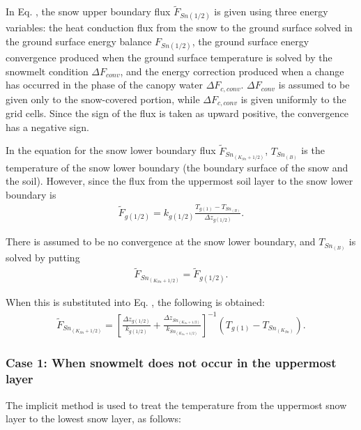 In Eq. \hyperref[8-30]{}, the snow upper boundary flux \(\widetilde{F}_{Sn(1/2)}\) is given using three energy variables: the heat conduction flux from the snow to the ground surface solved in the
ground surface energy balance \(F_{Sn(1/2)}\), the ground surface energy convergence produced when the ground surface temperature is solved by the snowmelt condition \(\Delta F_{conv}\), and the
energy correction produced when a change has occurred in the phase of the canopy water \(\Delta F_{c,conv}\). \(\Delta F_{conv}\) is assumed to be given only to the snow-covered portion, while
\(\Delta F_{c,conv}\) is given uniformly to the grid cells. Since the sign of the flux is taken as upward positive, the convergence has a negative sign.

In the equation for the snow lower boundary flux \(\widetilde{F}_{Sn_{(K_{Sn}+1/2)}}\), \(T_{Sn_{(B)}}\) is the temperature of the snow lower boundary (the boundary surface of the snow and the soil).
However, since the flux from the uppermost soil layer to the snow lower boundary is \begin{eqnarray}
\widetilde{F}_{g(1/2)} = k_{g(1/2)} \frac{T_{g(1)}-T_{Sn_{(B)}}}{\Delta z_{g(1/2)}}. \label{8-32}
\end{eqnarray}

There is assumed to be no convergence at the snow lower boundary, and \(T_{Sn_{(B)}}\) is solved by putting \begin{eqnarray}
\widetilde{F}_{Sn_{(K_{Sn}+1/2)}} = \widetilde{F}_{g(1/2)}. \label{8-33}
\end{eqnarray}

When this is substituted into Eq. \hyperref[8-30]{}, the following is obtained: \begin{eqnarray}
\widetilde{F}_{Sn_{(K_{Sn}+1/2)}}
 = \left[ \frac{\Delta z_{g(1/2)}}{k_{g(1/2)}}
  +\frac{\Delta z_{Sn_{(K_{Sn}+1/2)}}}{k_{Sn_{(K_{Sn}+1/2)}}}
 \right]^{-1}
 (T_{g(1)} - T_{Sn_{(K_{Sn})}}). \label{8-34}
\end{eqnarray}

\subsubsection{Case 1: When snowmelt does not occur in the uppermost layer}\label{case-1-when-snowmelt-does-not-occur-in-the-uppermost-layer}

The implicit method is used to treat the temperature from the uppermost snow layer to the lowest snow layer, as follows:

